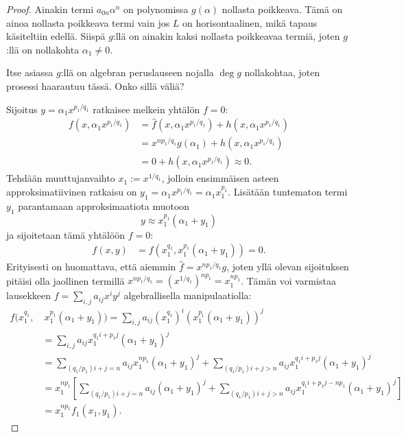 \begin{proof}
    Ainakin termi $a_{0n}\alpha^n$ on polynomissa $g(\alpha)$ nollasta poikkeava. Tämä on ainoa nollasta poikkeava termi vain jos $L$ on horisontaalinen, mikä tapaus käsiteltiin edellä. Siispä $g$:llä on ainakin kaksi nollasta poikkeavaa termiä, joten $g$:llä on nollakohta $\alpha_1\ne0$.
    \begin{huomautus}
        Itse asiassa $g$:llä on algebran peruslauseen nojalla $\deg g$ nollakohtaa, joten prosessi haarautuu tässä. Onko sillä väliä?
    \end{huomautus}
    Sijoitus $y=\alpha_1x^{p_1/q_1}$ ratkaisee melkein yhtälön $f=0$:
    \begin{align*}
        f(x,\alpha_1x^{p_1/q_1})&=\widehat f(x,\alpha_1x^{p_1/q_1})+h(x,\alpha_1x^{p_1/q_1}) \\
        &=x^{np_1/q_1}g(\alpha_1)+h(x,\alpha_1x^{p_1/q_1}) \\
        &=0+h(x,\alpha_1x^{p_1/q_1})\approx0.
    \end{align*}
    Tehdään muuttujanvaihto $x_1:=x^{1/q_1}$, jolloin ensimmäisen asteen approksimatiivinen ratkaisu on $y_1=\alpha_1x^{p_1/q_1}=\alpha_1x_1^{p_1}$. Lisätään tuntematon termi $y_1$ parantamaan approksimaatiota muotoon
    \begin{equation*}
        y\approx x_1^{p_1}(\alpha_1+y_1)
    \end{equation*}
    ja sijoitetaan tämä yhtälöön $f=0$:
    \begin{align*}
        f(x,y)&=f(x_1^{q_1},x_1^{p_1}(\alpha_1+y_1))=0.
    \end{align*}
    Erityisesti on huomattava, että aiemmin $\widehat f=x^{np_1/q_1}g$, joten yllä olevan sijoituksen pitäisi olla jaollinen termillä $x^{np_1/q_1}=(x^{1/q_1})^{np_1}=x_1^{np_1}$. Tämän voi varmistaa lausekkeen $f=\sum_{i,j}a_{ij}x^iy^j$ algebrallisella manipulaatiolla:
    \begin{align*}
        f(x_1^{q_1},&\ x_1^{p_1}(\alpha_1+y_1))
        =\sum_{i,j}a_{ij}(x_1^{q_1})^i(x_1^{p_1}(\alpha_1+y_1))^j \\
        &=\sum_{i,j}a_{ij}x_1^{q_1i+p_1j}(\alpha_1+y_1)^j \\
        &= \sum_{(q_1/p_1)i+j=n}a_{ij}x_1^{np_1}(\alpha_1+y_1)^j 
        + \sum_{(q_1/p_1)i+j>n}a_{ij}x_1^{q_1i+p_1j}(\alpha_1+y_1)^j \\
        &=x_1^{np_1}\left[\sum_{(q_1/p_1)i+j=n}a_{ij}(\alpha_1+y_1)^j 
        + \sum_{(q_1/p_1)i+j>n}a_{ij}x_1^{q_1i+p_1j-np_1}(\alpha_1+y_1)^j\right] \\
        &=x_1^{np_1}f_1(x_1,y_1).

\end{align*}
\end{proof}
